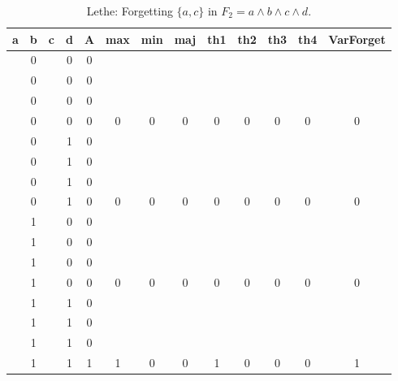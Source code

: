 \begin{table}[!tb]
    \centering
    \begin{tabular}{|c|c|c|c|c|c|c|c|c|c|c|c|c|}
        \hline
        \textbf{a} & \textbf{b} & \textbf{c} & \textbf{d} & \textbf{A} & \textbf{max} & \textbf{min} & \textbf{maj} & \textbf{th1} & \textbf{th2} & \textbf{th3} & \textbf{th4} & \textbf{VarForget} \\ \hline
        \rowcolor{gray!40}  & 0 &  & 0 & 0 &  &  &  &  &  &  &  &  \\ \hline
        \rowcolor{gray!40}  & 0 &  & 0 & 0 &  &  &  &  &  &  &  &  \\ \hline
        \rowcolor{gray!40}  & 0 &  & 0 & 0 &  &  &  &  &  &  &  &  \\ \hline
        \rowcolor{gray!40}  & 0 &  & 0 & 0 & 0 & 0 & 0 & 0 & 0 & 0 & 0 & 0 \\ \hline
        \rowcolor{blue!40}  & 0 &  & 1 & 0 &  &  &  &  &  &  &  &  \\ \hline
        \rowcolor{blue!40}  & 0 &  & 1 & 0 &  &  &  &  &  &  &  &  \\ \hline
        \rowcolor{blue!40}  & 0 &  & 1 & 0 &  &  &  &  &  &  &  &  \\ \hline
        \rowcolor{blue!40}  & 0 &  & 1 & 0 & 0 & 0 & 0 & 0 & 0 & 0 & 0 & 0 \\ \hline
        \rowcolor{red!40}  & 1 &  & 0 & 0 &  &  &  &  &  &  &  &  \\ \hline
        \rowcolor{red!40}  & 1 &  & 0 & 0 &  &  &  &  &  &  &  &  \\ \hline
        \rowcolor{red!40}  & 1 &  & 0 & 0 &  &  &  &  &  &  &  &  \\ \hline
        \rowcolor{red!40}  & 1 &  & 0 & 0 & 0 & 0 & 0 & 0 & 0 & 0 & 0 & 0 \\ \hline
        \rowcolor{green!40}  & 1 &  & 1 & 0 &  &  &  &  &  &  &  &  \\ \hline
        \rowcolor{green!40}  & 1 &  & 1 & 0 &  &  &  &  &  &  &  &  \\ \hline
        \rowcolor{green!40}  & 1 &  & 1 & 0 &  &  &  &  &  &  &  &  \\ \hline
        \rowcolor{green!40}  & 1 &  & 1 & 1 & 1 & 0 & 0 & 1 & 0 & 0 & 0 & 1 \\ \hline
    \end{tabular}
    \caption{Lethe: Forgetting $\{a, c\}$ in $F_{2} = a \land b \land c \land d$.}
    \label{tab:lethe-F2-ac}
\end{table}

